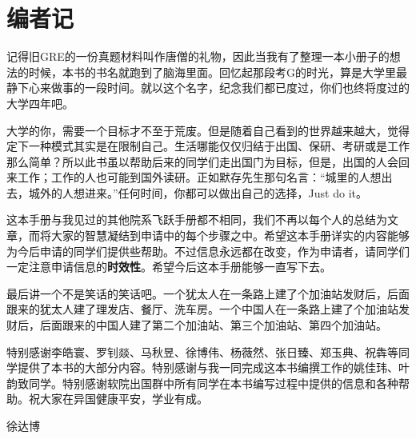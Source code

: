 \chapter*{编者记}
\pagestyle{plain}
记得旧GRE的一份真题材料叫作唐僧的礼物，因此当我有了整理一本小册子的想法的时候，本书的书名就跑到了脑海里面。回忆起那段考G的时光，算是大学里最静下心来做事的一段时间。就以这个名字，纪念我们都已度过，你们也终将度过的大学四年吧。\par

大学的你，需要一个目标才不至于荒废。但是随着自己看到的世界越来越大，觉得定下一种模式其实是在限制自己。生活哪能仅仅归结于出国、保研、考研或是工作那么简单？所以此书虽以帮助后来的同学们走出国门为目标，但是，出国的人会回来工作；工作的人也可能到国外读研。正如默存先生那句名言：“城里的人想出去，城外的人想进来。”任何时间，你都可以做出自己的选择，Just do it。\par

这本手册与我见过的其他院系飞跃手册都不相同，我们不再以每个人的总结为文章，而将大家的智慧凝结到申请中的每个步骤之中。希望这本手册详实的内容能够为今后申请的同学们提供些帮助。不过信息永远都在改变，作为申请者，请同学们一定注意申请信息的\textbf{时效性}。希望今后这本手册能够一直写下去。\par

最后讲一个不是笑话的笑话吧。一个犹太人在一条路上建了个加油站发财后，后面跟来的犹太人建了理发店、餐厅、洗车房。一个中国人在一条路上建了个加油站发财后，后面跟来的中国人建了第二个加油站、第三个加油站、第四个加油站。\par

特别感谢李皓寰、罗钊燚、马秋昱、徐博伟、杨薇然、张日臻、郑玉典、祝犇等同学提供了本书的大部分内容。特别感谢与我一同完成这本书编撰工作的姚佳玮、叶韵致同学。特别感谢软院出国群中所有同学在本书编写过程中提供的信息和各种帮助。祝大家在异国健康平安，学业有成。\par

\hspace*{\fill} 徐达博
\clearpage